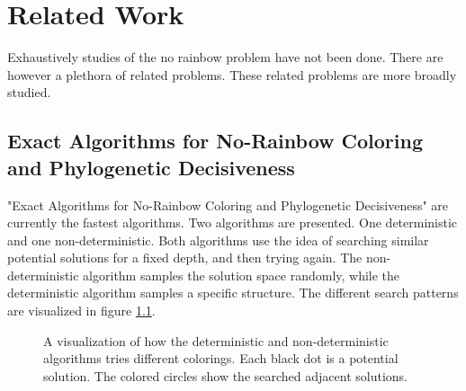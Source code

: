 \documentclass[msc,lith,english]{liuthesis}
\begin{document}
\chapter{Related Work}
Exhaustively studies of the no rainbow problem have not been done. There are however a plethora of related problems.
These related problems are more broadly studied.

\section{Exact Algorithms for No-Rainbow Coloring and Phylogenetic Decisiveness}
"Exact Algorithms for No-Rainbow Coloring and Phylogenetic Decisiveness" are currently the fastest algorithms.
Two algorithms are presented. One deterministic and one non-deterministic. Both
algorithms use the idea of searching similar potential solutions for a fixed
depth, and then trying again. The non-deterministic algorithm samples the
solution space randomly, while the deterministic algorithm samples a specific
structure. The different search patterns are visualized in figure \ref{figNoRainbowSearchPattern}. \cite{sourceNoRainbow}

\begin{center}
\begin{figure}[h]
\centering
{}
  \caption{A visualization of how the deterministic and non-deterministic algorithms tries different colorings. Each black dot is a potential solution. The colored circles show the searched adjacent solutions.}
  \label{figNoRainbowSearchPattern}
\end{figure}
\end{center}
\end{document}
